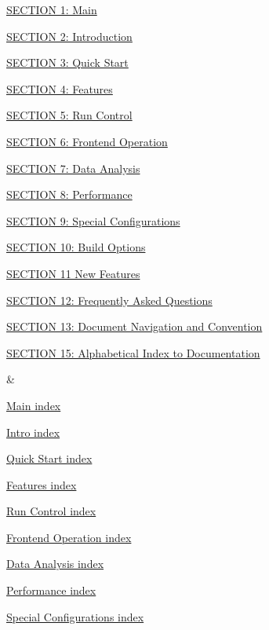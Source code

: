 \begin{TabularC}{2}
\begin{DoxyItemize}
\item \hyperlink{index_Top}{SECTION 1: Main} 
\item \hyperlink{Intro}{SECTION 2: Introduction} 
\item \hyperlink{Quickstart}{SECTION 3: Quick Start} 
\item \hyperlink{Features}{SECTION 4: Features} 
\item \hyperlink{RunControl}{SECTION 5: Run Control} 
\item \hyperlink{FrontendOperation}{SECTION 6: Frontend Operation} 
\item \hyperlink{DataAnalysis}{SECTION 7: Data Analysis} 
\item \hyperlink{Performance}{SECTION 8: Performance} 
\item \hyperlink{SpecialConfig}{SECTION 9: Special Configurations} 
\item \hyperlink{BuildingOptions}{SECTION 10: Build Options} 
\item \hyperlink{NDF}{SECTION 11 New Features} 
\item \hyperlink{FAQ}{SECTION 12: Frequently Asked Questions} 
\item \hyperlink{Convention}{SECTION 13: Document Navigation and Convention} 
\item \hyperlink{DocIndex}{SECTION 15: Alphabetical Index to Documentation}  
\end{DoxyItemize}&
\begin{DoxyItemize}
\item \hyperlink{O_Contents_Page}{Main index} 
\item \hyperlink{O_Contents_Page_Intro_section_index}{Intro index} 
\item \hyperlink{O_Contents_Page_Quickstart_section_index}{Quick Start index} 
\item \hyperlink{O_Contents_Page_Features_section_index}{Features index} 
\item \hyperlink{O_Contents_Page_RunControl_section_index}{Run Control index} 
\item \hyperlink{O_Contents_Page_FrontendOperation_section_index}{Frontend Operation index} 
\item \hyperlink{O_Contents_Page_DataAnalysis_section_index}{Data Analysis index} 
\item \hyperlink{O_Contents_Page_Performance_section_index}{Performance index} 
\item \hyperlink{O_Contents_Page_SpecialConfig_section_index}{Special Configurations index} 

\end{DoxyItemize}
\end{TabularC}
